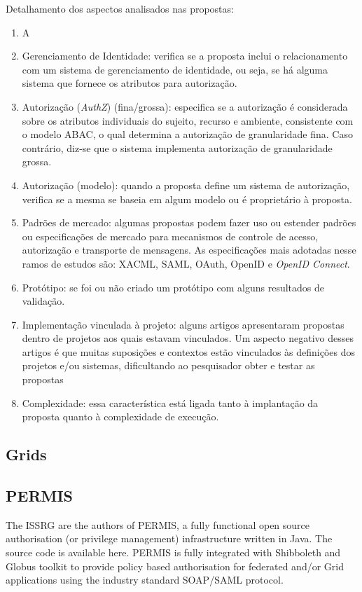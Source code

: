 \documentclass{doublecol-new}
\begin{document}
Detalhamento dos aspectos analisados nas propostas:
\begin{enumerate}
	\item A
	\item Gerenciamento de Identidade: verifica se a proposta inclui o relacionamento com um sistema de gerenciamento de identidade, ou seja, se há alguma sistema que fornece os atributos para autorização.
	\item Autorização (\textit{AuthZ}) (fina/grossa): especifica se a autorização é considerada sobre os atributos individuais do sujeito, recurso e ambiente, consistente com o modelo ABAC, o qual determina a autorização de granularidade fina. Caso contrário, diz-se que o sistema implementa autorização de granularidade grossa.
	\item Autorização (modelo): quando a proposta define um sistema de autorização, verifica se a mesma se baseia em algum modelo ou é proprietário à proposta.
	\item Padrões de mercado: algumas propostas podem fazer uso ou estender padrões ou especificações de mercado para mecanismos de controle de acesso, autorização e transporte de mensagens. As especificações mais adotadas nesse ramos de estudos são: XACML, SAML, OAuth, OpenID e \textit{OpenID Connect}.
	\item Protótipo: se foi ou não criado um protótipo com alguns resultados de validação.
	\item Implementação vinculada à projeto: alguns artigos apresentaram propostas dentro de projetos aos quais estavam vinculados. Um aspecto negativo desses artigos é que muitas suposições e contextos estão vinculados às definições dos projetos e/ou sistemas, dificultando ao pesquisador obter e testar as propostas
	\item Complexidade: essa característica está ligada tanto à implantação da proposta quanto à complexidade de execução.
\end{enumerate}


\subsection{Grids}


\subsection{PERMIS}


The ISSRG are the authors of PERMIS, a fully functional open source authorisation (or privilege management) infrastructure written in Java. The source code is available here. PERMIS is fully integrated with Shibboleth and Globus toolkit to provide policy based authorisation for federated and/or Grid applications using the industry standard SOAP/SAML protocol. 
\end{document}
